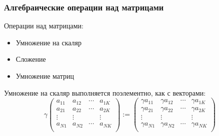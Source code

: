 \begin{frame}
    \frametitle{Алгебраические операции над матрицами}

    \vspace{2em}
    Операции над матрицами:
    
    \begin{itemize}
        \item Умножение на скаляр 
        \item Сложение
        \item Умножение матриц
    \end{itemize}
    
    \vspace{.7em}
    Умножение на скаляр выполняется поэлементно, как с векторами:
    \begin{equation*}
        \gamma 
        \left(
        \begin{array}{cccc}
            a_{11} & a_{12} & \cdots & a_{1K} \\
            a_{21} & a_{22} & \cdots & a_{2K} \\
            \vdots & \vdots &  & \vdots \\
            a_{N1} & a_{N2} & \cdots & a_{NK} \\
        \end{array}
        \right)
        :=
        \left(
        \begin{array}{cccc}
            \gamma a_{11} & \gamma a_{12} & \cdots & \gamma a_{1K} \\
            \gamma a_{21} & \gamma a_{22} & \cdots & \gamma a_{2K} \\
            \vdots & \vdots &  & \vdots \\
            \gamma a_{N1} & \gamma a_{N2} & \cdots & \gamma a_{NK} \\
        \end{array}
        \right)
    \end{equation*}

\end{frame}

